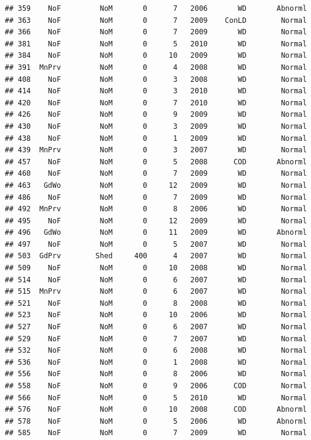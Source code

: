\documentclass[]{article}
\begin{document}
\begin{verbatim}
## 359    NoF         NoM       0      7   2006       WD       Abnorml
## 363    NoF         NoM       0      7   2009    ConLD        Normal
## 366    NoF         NoM       0      7   2009       WD        Normal
## 381    NoF         NoM       0      5   2010       WD        Normal
## 384    NoF         NoM       0     10   2009       WD        Normal
## 391  MnPrv         NoM       0      4   2008       WD        Normal
## 408    NoF         NoM       0      3   2008       WD        Normal
## 414    NoF         NoM       0      3   2010       WD        Normal
## 420    NoF         NoM       0      7   2010       WD        Normal
## 426    NoF         NoM       0      9   2009       WD        Normal
## 430    NoF         NoM       0      3   2009       WD        Normal
## 438    NoF         NoM       0      1   2009       WD        Normal
## 439  MnPrv         NoM       0      3   2007       WD        Normal
## 457    NoF         NoM       0      5   2008      COD       Abnorml
## 460    NoF         NoM       0      7   2009       WD        Normal
## 463   GdWo         NoM       0     12   2009       WD        Normal
## 486    NoF         NoM       0      7   2009       WD        Normal
## 492  MnPrv         NoM       0      8   2006       WD        Normal
## 495    NoF         NoM       0     12   2009       WD        Normal
## 496   GdWo         NoM       0     11   2009       WD       Abnorml
## 497    NoF         NoM       0      5   2007       WD        Normal
## 503  GdPrv        Shed     400      4   2007       WD        Normal
## 509    NoF         NoM       0     10   2008       WD        Normal
## 514    NoF         NoM       0      6   2007       WD        Normal
## 515  MnPrv         NoM       0      6   2007       WD        Normal
## 521    NoF         NoM       0      8   2008       WD        Normal
## 523    NoF         NoM       0     10   2006       WD        Normal
## 527    NoF         NoM       0      6   2007       WD        Normal
## 529    NoF         NoM       0      7   2007       WD        Normal
## 532    NoF         NoM       0      6   2008       WD        Normal
## 536    NoF         NoM       0      1   2008       WD        Normal
## 556    NoF         NoM       0      8   2006       WD        Normal
## 558    NoF         NoM       0      9   2006      COD        Normal
## 566    NoF         NoM       0      5   2010       WD        Normal
## 576    NoF         NoM       0     10   2008      COD       Abnorml
## 578    NoF         NoM       0      5   2006       WD       Abnorml
## 585    NoF         NoM       0      7   2009       WD        Normal

\end{verbatim}
\end{document}
